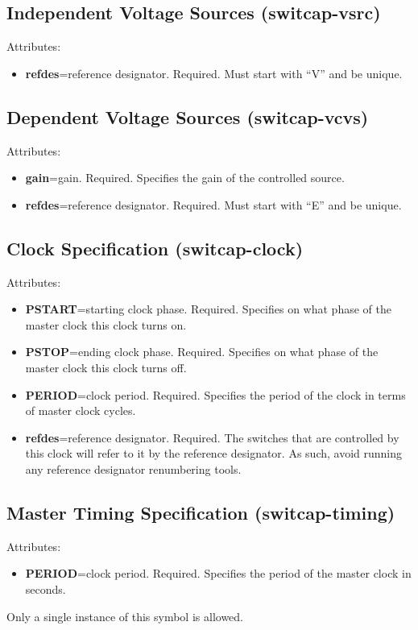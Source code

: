 \documentclass{article}
\begin{document}
\subsection{Independent Voltage Sources (switcap-vsrc)}
Attributes:
\begin{itemize}
\item {\bf refdes}=reference designator.  Required.  Must start with
  ``V'' and be unique.
\end{itemize}

\subsection{Dependent Voltage Sources (switcap-vcvs)}
Attributes:
\begin{itemize}
\item {\bf gain}=gain.  Required.  Specifies the gain of the
  controlled source.
\item {\bf refdes}=reference designator.  Required.  Must start with
  ``E'' and be unique.
\end{itemize}

\subsection{Clock Specification (switcap-clock)}
Attributes:
\begin{itemize}
\item {\bf PSTART}=starting clock phase.  Required.  Specifies on what
  phase of the master clock this clock turns on.
\item {\bf PSTOP}=ending clock phase.  Required.  Specifies on what
  phase of the master clock this clock turns off.
\item {\bf PERIOD}=clock period.  Required.  Specifies the period of
  the clock in terms of master clock cycles.
\item {\bf refdes}=reference designator.  Required.  The switches that
  are controlled by this clock will refer to it by the reference
  designator.  As such, avoid running any reference designator
  renumbering tools.
\end{itemize}

\subsection{Master Timing Specification (switcap-timing)}
Attributes:
\begin{itemize}
\item {\bf PERIOD}=clock period.  Required.  Specifies the period of
  the master clock in seconds.
\end{itemize}
Only a single instance of this symbol is allowed.
\end{document}

